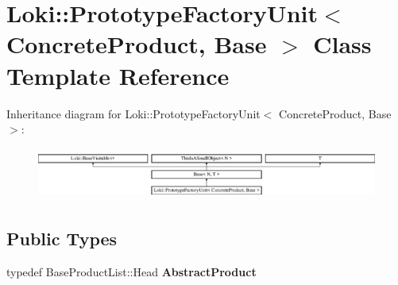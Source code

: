 \hypertarget{classLoki_1_1PrototypeFactoryUnit}{}\section{Loki\+:\+:Prototype\+Factory\+Unit$<$ Concrete\+Product, Base $>$ Class Template Reference}
\label{classLoki_1_1PrototypeFactoryUnit}
Inheritance diagram for Loki\+:\+:Prototype\+Factory\+Unit$<$ Concrete\+Product, Base $>$\+:\begin{figure}[H]
\begin{center}
\leavevmode
\includegraphics[height=1.723077cm]{classLoki_1_1PrototypeFactoryUnit}
\end{center}
\end{figure}
\subsection*{Public Types}
\begin{DoxyCompactItemize}
\item 
\hypertarget{classLoki_1_1PrototypeFactoryUnit_ae5366555c93afd2f58759dd353070a0d}{}typedef Base\+Product\+List\+::\+Head {\bfseries Abstract\+Product}\label{classLoki_1_1PrototypeFactoryUnit_ae5366555c93afd2f58759dd353070a0d}

\end{DoxyCompactItemize}
